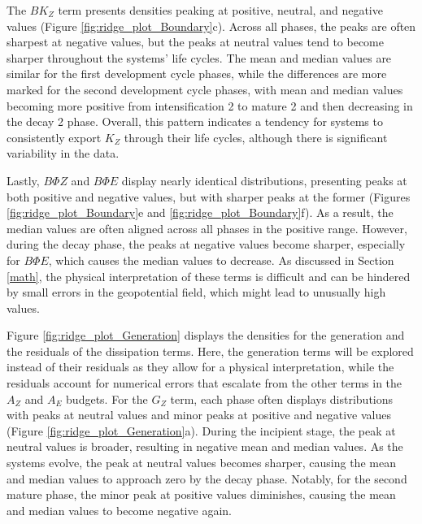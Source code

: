 The $BK_Z$ term presents densities peaking at positive, neutral, and negative values (Figure \ref{fig:ridge_plot_Boundary}c). Across all phases, the peaks are often sharpest at negative values, but the peaks at neutral values tend to become sharper throughout the systems' life cycles. The mean and median values are similar for the first development cycle phases, while the differences are more marked for the second development cycle phases, with mean and median values becoming more positive from intensification 2 to mature 2 and then decreasing in the decay 2 phase. Overall, this pattern indicates a tendency for systems to consistently export $K_Z$ through their life cycles, although there is significant variability in the data.

Lastly, $B\Phi Z$ and $B\Phi E$ display nearly identical distributions, presenting peaks at both positive and negative values, but with sharper peaks at the former (Figures \ref{fig:ridge_plot_Boundary}e and \ref{fig:ridge_plot_Boundary}f). As a result, the median values are often aligned across all phases in the positive range. However, during the decay phase, the peaks at negative values become sharper, especially for $B\Phi E$, which causes the median values to decrease. As discussed in Section \ref{math}, the physical interpretation of these terms is difficult and can be hindered by small errors in the geopotential field, which might lead to unusually high values.

Figure \ref{fig:ridge_plot_Generation} displays the densities for the generation and the residuals of the dissipation terms. Here, the generation terms will be explored instead of their residuals as they allow for a physical interpretation, while the residuals account for numerical errors that escalate from the other terms in the $A_Z$ and $A_E$ budgets. For the $G_Z$ term, each phase often displays distributions with peaks at neutral values and minor peaks at positive and negative values (Figure \ref{fig:ridge_plot_Generation}a). During the incipient stage, the peak at neutral values is broader, resulting in negative mean and median values. As the systems evolve, the peak at neutral values becomes sharper, causing the mean and median values to approach zero by the decay phase. Notably, for the second mature phase, the minor peak at positive values diminishes, causing the mean and median values to become negative again.

